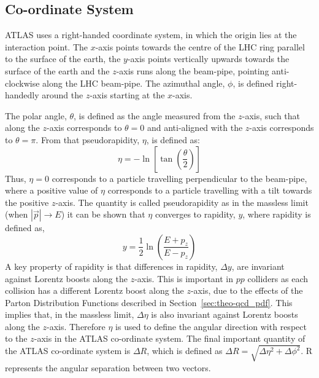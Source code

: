 \FloatBarrier
\vspace{-1em}
\subsection{Co-ordinate System}
\label{sec:det-coordinate}

ATLAS uses a right-handed coordinate system, in which the origin lies at the interaction point.
The $x$-axis points towards the centre of the LHC ring parallel to the surface of the earth,
the $y$-axis points vertically upwards towards the surface of the earth
and the $z$-axis runs along the beam-pipe, pointing anti-clockwise along the LHC beam-pipe.
The azimuthal angle, $\phi$, is defined right-handedly around the $z$-axis starting at the $x$-axis.

The polar angle, $\theta$, is defined as the angle measured from the $z$-axis,
such that along the $z$-axis corresponds to $\theta = 0$
and anti-aligned with the $z$-axis corresponds to $\theta = \pi$.
From that pseudorapidity, $\eta$, is defined as:
\begin{equation}
 \eta = -\ln\left[\tan\left( \frac{\theta}{2} \right) \right]
\end{equation}
Thus, $\eta = 0$ corresponds to a particle travelling perpendicular to the beam-pipe,
where a positive value of $\eta$ corresponds to a particle travelling with a tilt towards the positive $z$-axis.
The quantity is called pseudorapidity as in the massless limit (when $|\vec{p}| \to E$)
it can be shown that $\eta$ converges to rapidity, $y$, where rapidity is defined as,
\begin{equation}
  y = \frac{1}{2} \ln \left( \frac{E+p_{z}}{E-p_{z}} \right)
\end{equation}
A key property of rapidity is that differences in rapidity, $\Delta y$, are invariant against Lorentz boosts along the $z$-axis.
This is important in $pp$ colliders as each collision has  a different Lorentz boost along the $z$-axis,
due to the effects of the Parton Distribution Functions described in Section~\ref{sec:theo-qcd_pdf}.
This implies that, in the massless limit, $\Delta \eta$ is also invariant against Lorentz boosts along the $z$-axis.
Therefore $\eta$ is used to define the angular direction with respect to the $z$-axis in the ATLAS co-ordinate system.
The final important quantity of the ATLAS co-ordinate system is $\Delta R$, which is defined as $\Delta R = \sqrt{\Delta\eta^{2} + \Delta\phi^{2}}$.  
\Delta R represents the angular separation between two vectors.


